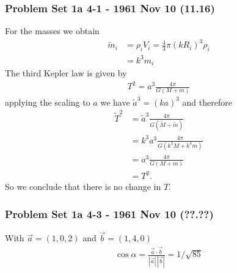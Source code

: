\documentclass[10pt,a4paper]{article}
\theoremstyle{definition}
\begin{document}
\subsubsection{Problem Set 1a 4-1 - 1961 Nov 10 (11.16)}
For the masses we obtain
\begin{align}
\widetilde{m}_i
&=\rho_i V_i=\frac{4}{3}\pi (kR_i)^3\rho_i\\
&=k^3m_i
\end{align}
The third Kepler law is given by
\begin{align}
T^2=a^3\frac{4\pi}{G(M+m)}
\end{align}
applying the scaling to $a$ we have $\widetilde{a}^3=(ka)^3$ and therefore
\begin{align}
\widetilde{T}^2
&=\widetilde{a}^3\frac{4\pi}{G(\widetilde{M}+\widetilde{m})}\\
&=k^3a^3\frac{4\pi}{G(k^3M+k^3m)}\\
&=a^3\frac{4\pi}{G(M+m)}\\
&=T^2.
\end{align}
So we conclude that there is no change in $T$. 

\subsubsection{Problem Set 1a 4-3 - 1961 Nov 10 (??.??)}
With $\vec{a}=(1,0,2)$ and $\vec{b}=(1,4,0)$
\begin{align}
\cos\alpha=\frac{\vec{a}\cdot\vec{b}}{|\vec{a}|\,|\vec{b}|}
=1/\sqrt{85}
\end{align}
\end{document}
